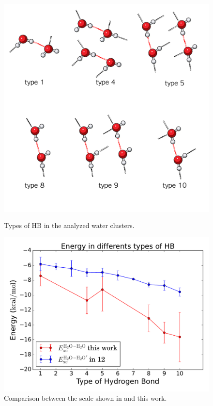 \begin{figure}
  \begin{minipage}[t]{0.49\textwidth}
    \centering
    \includegraphics[width=\textwidth]{4/plots/dibujitos/awitas.png}
    \caption{Types of HB in the analyzed water clusters.}
    \label{typesHB}
  \end{minipage}%
  \hfill
  \begin{minipage}[t]{0.49\textwidth}
    \centering
    \includegraphics[width=\textwidth]{4/plots/promelf/types.pdf}
    \caption{Comparison between the scale shown in  and this work.}
    \label{escala2020}
  \end{minipage}%
\end{figure}
